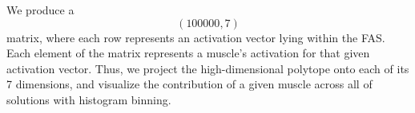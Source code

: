 

We produce a $$(100000,7)$$ matrix, where each row represents an activation vector lying within the FAS. Each element of the matrix represents a muscle's activation for that given activation vector. Thus, we project the high-dimensional polytope onto each of its 7 dimensions, and visualize the contribution of a given muscle across all of solutions with histogram binning.


